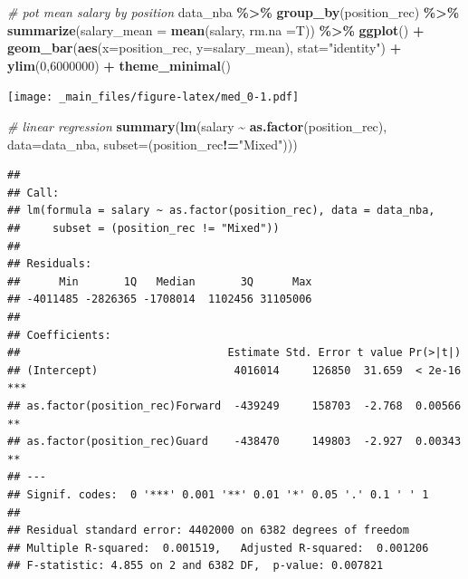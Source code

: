 \documentclass[
]{book}
\newenvironment{Shaded}{\begin{snugshade}}{\end{snugshade}}
\newcommand{\AttributeTok}[1]{\textcolor[rgb]{0.13,0.29,0.53}{#1}}
\newcommand{\CommentTok}[1]{\textcolor[rgb]{0.56,0.35,0.01}{\textit{#1}}}
\newcommand{\DecValTok}[1]{\textcolor[rgb]{0.00,0.00,0.81}{#1}}
\newcommand{\FunctionTok}[1]{\textcolor[rgb]{0.13,0.29,0.53}{\textbf{#1}}}
\newcommand{\NormalTok}[1]{#1}
\newcommand{\SpecialCharTok}[1]{\textcolor[rgb]{0.81,0.36,0.00}{\textbf{#1}}}
\newcommand{\StringTok}[1]{\textcolor[rgb]{0.31,0.60,0.02}{#1}}
\begin{document}
\begin{Shaded}
\begin{Highlighting}[]
\CommentTok{\# pot mean salary by position}
\NormalTok{data\_nba }\SpecialCharTok{\%\textgreater{}\%} \FunctionTok{group\_by}\NormalTok{(position\_rec) }\SpecialCharTok{\%\textgreater{}\%}
  \FunctionTok{summarize}\NormalTok{(}\AttributeTok{salary\_mean =} \FunctionTok{mean}\NormalTok{(salary, }\AttributeTok{rm.na =}\NormalTok{T)) }\SpecialCharTok{\%\textgreater{}\%}
  \FunctionTok{ggplot}\NormalTok{() }\SpecialCharTok{+}
  \FunctionTok{geom\_bar}\NormalTok{(}\FunctionTok{aes}\NormalTok{(}\AttributeTok{x=}\NormalTok{position\_rec, }\AttributeTok{y=}\NormalTok{salary\_mean), }\AttributeTok{stat=}\StringTok{"identity"}\NormalTok{) }\SpecialCharTok{+}
  \FunctionTok{ylim}\NormalTok{(}\DecValTok{0}\NormalTok{,}\DecValTok{6000000}\NormalTok{) }\SpecialCharTok{+}
  \FunctionTok{theme\_minimal}\NormalTok{()}
\end{Highlighting}
\end{Shaded}

\texttt{[image: \_main\_files/figure-latex/med\_0-1.pdf]}

\begin{Shaded}
\begin{Highlighting}[]
\CommentTok{\# linear regression}
\FunctionTok{summary}\NormalTok{(}\FunctionTok{lm}\NormalTok{(salary }\SpecialCharTok{\textasciitilde{}} \FunctionTok{as.factor}\NormalTok{(position\_rec), }\AttributeTok{data=}\NormalTok{data\_nba, }\AttributeTok{subset=}\NormalTok{(position\_rec}\SpecialCharTok{!=}\StringTok{"Mixed"}\NormalTok{)))}
\end{Highlighting}
\end{Shaded}

\begin{verbatim}
## 
## Call:
## lm(formula = salary ~ as.factor(position_rec), data = data_nba, 
##     subset = (position_rec != "Mixed"))
## 
## Residuals:
##      Min       1Q   Median       3Q      Max 
## -4011485 -2826365 -1708014  1102456 31105006 
## 
## Coefficients:
##                                Estimate Std. Error t value Pr(>|t|)    
## (Intercept)                     4016014     126850  31.659  < 2e-16 ***
## as.factor(position_rec)Forward  -439249     158703  -2.768  0.00566 ** 
## as.factor(position_rec)Guard    -438470     149803  -2.927  0.00343 ** 
## ---
## Signif. codes:  0 '***' 0.001 '**' 0.01 '*' 0.05 '.' 0.1 ' ' 1
## 
## Residual standard error: 4402000 on 6382 degrees of freedom
## Multiple R-squared:  0.001519,   Adjusted R-squared:  0.001206 
## F-statistic: 4.855 on 2 and 6382 DF,  p-value: 0.007821
\end{verbatim}
\end{document}
